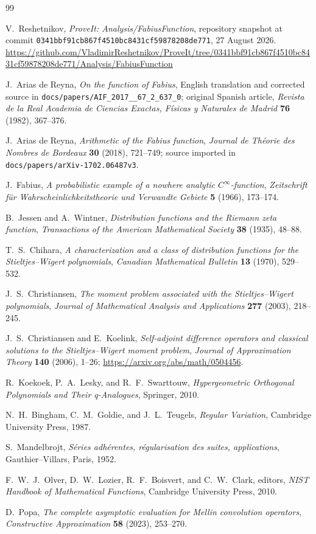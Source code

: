 \documentclass[11pt,oneside]{article}
\numberwithin{equation}{section}
\theoremstyle{plain}
\theoremstyle{definition}
\theoremstyle{remark}
\newcommand{\RepoCommit}{\nolinkurl{0341bbf91cb867f4510bc8431cf59878208de771}}
\begin{document}
\begin{thebibliography}{99}

V.~Reshetnikov,
\emph{ProveIt: Analysis/FabiusFunction}, repository snapshot at commit
\RepoCommit, 27 August 2026.
\url{https://github.com/VladimirReshetnikov/ProveIt/tree/0341bbf91cb867f4510bc8431cf59878208de771/Analysis/FabiusFunction}

J.~Arias de Reyna,
\emph{On the function of Fabius},
English translation and corrected source in
\texttt{docs/papers/AIF\_2017\_\_67\_2\_637\_0}; original Spanish article,
\emph{Revista de la Real Academia de Ciencias Exactas, F\'isicas y Naturales de Madrid}
\textbf{76} (1982), 367--376.

J.~Arias de Reyna,
\emph{Arithmetic of the Fabius function},
\emph{Journal de Th\'eorie des Nombres de Bordeaux} \textbf{30} (2018), 721--749;
source imported in \texttt{docs/papers/arXiv-1702.06487v3}.

J.~Fabius,
\emph{A probabilistic example of a nowhere analytic $C^\infty$-function},
\emph{Zeitschrift f\"ur Wahrscheinlichkeitstheorie und Verwandte Gebiete}
\textbf{5} (1966), 173--174.

B.~Jessen and A.~Wintner,
\emph{Distribution functions and the Riemann zeta function},
\emph{Transactions of the American Mathematical Society} \textbf{38} (1935), 48--88.

T.~S.~Chihara,
\emph{A characterization and a class of distribution functions for the
Stieltjes--Wigert polynomials},
\emph{Canadian Mathematical Bulletin} \textbf{13} (1970), 529--532.

J.~S.~Christiansen,
\emph{The moment problem associated with the Stieltjes--Wigert polynomials},
\emph{Journal of Mathematical Analysis and Applications} \textbf{277} (2003), 218--245.

J.~S.~Christiansen and E.~Koelink,
\emph{Self-adjoint difference operators and classical solutions to the
Stieltjes--Wigert moment problem},
\emph{Journal of Approximation Theory} \textbf{140} (2006), 1--26;
\url{https://arxiv.org/abs/math/0504456}.

R.~Koekoek, P.~A.~Lesky, and R.~F.~Swarttouw,
\emph{Hypergeometric Orthogonal Polynomials and Their q-Analogues},
Springer, 2010.

N.~H.~Bingham, C.~M.~Goldie, and J.~L.~Teugels,
\emph{Regular Variation},
Cambridge University Press, 1987.

S.~Mandelbrojt,
\emph{S\'eries adh\'erentes, r\'egularisation des suites, applications},
Gauthier--Villars, Paris, 1952.

F.~W.~J.~Olver, D.~W.~Lozier, R.~F.~Boisvert, and C.~W.~Clark, editors,
\emph{NIST Handbook of Mathematical Functions},
Cambridge University Press, 2010.

D.~Popa,
\emph{The complete asymptotic evaluation for Mellin convolution operators},
\emph{Constructive Approximation} \textbf{58} (2023), 253--270.

\end{thebibliography}
\end{document}
